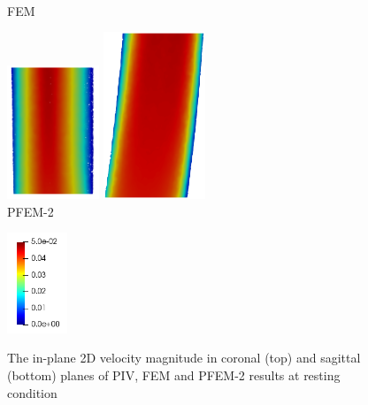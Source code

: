\begin{figure}
\begin{minipage}[c][10cm][c]{0.25\textwidth}
\\FEM
\end{minipage}
\begin{minipage}[c][10cm][c]{0.25\textwidth}
\centering
\vspace*{\fill}
\includegraphics[height=4cm]{imgs/vena_cava/PFEM_coronal_rest.png}
\includegraphics[height=5cm]{imgs/vena_cava/PFEM_sagittal_rest.png}
\\PFEM-2
\end{minipage}
\begin{minipage}[c][10cm][t]{0.1\textwidth}
\vspace*{\fill}
\centering
\includegraphics[height=3cm]{imgs/vena_cava/colormap_rest.png}
\\
\end{minipage}
\caption{The in-plane 2D velocity magnitude in coronal (top) and sagittal (bottom) planes of PIV, FEM and PFEM-2 results at resting condition}
\label{fig:process1}
\end{figure}

